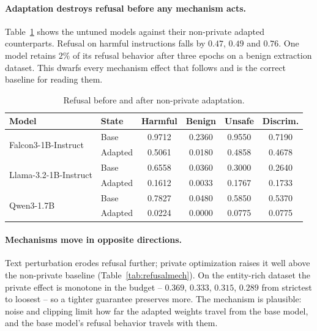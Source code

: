 \paragraph{Adaptation destroys refusal before any mechanism acts.}
Table~\ref{tab:refusalbase} shows the untuned models against their non-private adapted counterparts.
Refusal on harmful instructions falls by $0.47$,
$0.49$ and $0.76$.
One model retains $2\%$ of its refusal behavior after three epochs on a benign extraction dataset.
This dwarfs every mechanism effect that follows and is the correct baseline for reading them.

\begin{table}[t]
  \centering
  \caption{Refusal before and after non-private adaptation.}
  \label{tab:refusalbase}
  \begin{tabular}{llcccc}
    \toprule
    Model & State & Harmful & Benign & Unsafe & Discrim. \\
    \midrule
    \multirow{2}{*}{Falcon3-1B-Instruct}
      & Base    & 0.9712 & 0.2360 & 0.9550 & 0.7190 \\
      & Adapted & 0.5061 & 0.0180 & 0.4858 & 0.4678 \\
    \multirow{2}{*}{Llama-3.2-1B-Instruct}
      & Base    & 0.6558 & 0.0360 & 0.3000 & 0.2640 \\
      & Adapted & 0.1612 & 0.0033 & 0.1767 & 0.1733 \\
    \multirow{2}{*}{Qwen3-1.7B}
      & Base    & 0.7827 & 0.0480 & 0.5850 & 0.5370 \\
      & Adapted & 0.0224 & 0.0000 & 0.0775 & 0.0775 \\
    \bottomrule
  \end{tabular}
\end{table}

\paragraph{Mechanisms move in opposite directions.}
Text perturbation erodes refusal further;
private optimization raises it well above the non-private baseline (Table~\ref{tab:refusalmech}).
On the entity-rich dataset the private effect is monotone in the budget -- $0.369$,
$0.333$,
$0.315$,
$0.289$ from strictest to loosest -- so a tighter guarantee preserves more.
The mechanism is plausible:
noise and clipping limit how far the adapted weights travel from the base model,
and the base model's refusal behavior travels with them.

